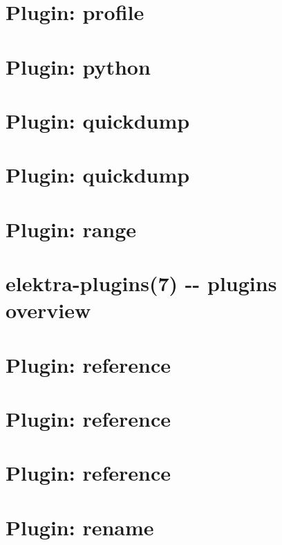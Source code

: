 \documentclass[twoside]{book}
\newcommand{\+}{\discretionary{\mbox{\scriptsize$\hookleftarrow$}}{}{}}
\begin{document}
\chapter{Plugin\+: profile}
\label{autotoc_md538}

\chapter{Plugin\+: python}
\label{autotoc_md540}

\chapter{Plugin\+: quickdump}
\label{autotoc_md546}

\chapter{Plugin\+: quickdump}
\label{autotoc_md562}

\chapter{Plugin\+: range}
\label{autotoc_md572}

\chapter{elektra-\/plugins(7) -\/-\/ plugins overview}
\label{src_plugins_README_md}

\chapter{Plugin\+: reference}
\label{autotoc_md594}

\chapter{Plugin\+: reference}
\label{autotoc_md595}

\chapter{Plugin\+: reference}
\label{autotoc_md597}

\chapter{Plugin\+: rename}
\label{autotoc_md603}

\end{document}
